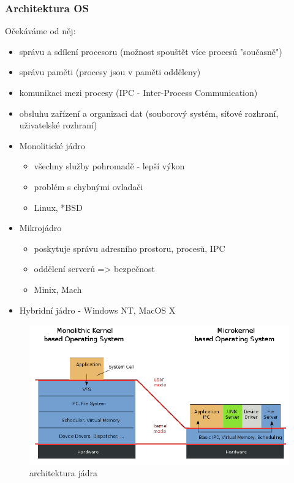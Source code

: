 \documentclass[10pt,a4paper]{article}
\begin{document}
\subsubsection{Architektura OS}
Očekáváme od něj:
\begin{itemize}
	\item správu a sdílení procesoru (možnost spouštět více procesů "současně")
	\item správu paměti (procesy jsou v paměti odděleny)
	\item komunikaci mezi procesy (IPC - Inter-Process Communication)
	\item obsluhu zařízení a organizaci dat (souborový systém, síťové rozhraní, uživatelské rozhraní)
\end{itemize}

\begin{itemize}
	\item Monolitické jádro
	\begin{itemize}	
		\item všechny služby pohromadě - lepší výkon
		\item problém s chybnými ovladači
		\item Linux, *BSD
	\end{itemize}
	\item Mikrojádro 
	\begin{itemize}	
		\item poskytuje správu adresního prostoru, procesů, IPC
		\item oddělení serverů => bezpečnost
		\item Minix, Mach
	\end{itemize}
	\item Hybridní jádro - Windows NT, MacOS X
\end{itemize}

\begin{figure} [h]
		\includegraphics[scale=0.8]{img/architektura_jadra.png}
		\caption{architektura jádra}	
\end{figure}
\end{document}

